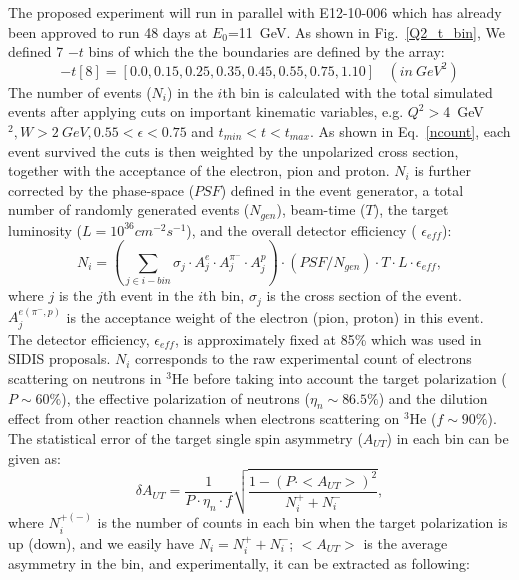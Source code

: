 The proposed experiment will run in parallel with E12-10-006 which has already been approved to run 48 days at $E_{0}$=11~GeV.  As shown in
Fig.~\ref{Q2_t_bin}, We defined 7 $-t$ bins of which the the boundaries are
defined by the array:
 \begin{equation}
     -t[8] = [0.0, 0.15, 0.25, 0.35, 0.45, 0.55, 0.75, 1.10]~~~~(in~GeV^{2})
 \end{equation}
The number of events ($N_{i}$) in the $i$th bin is calculated with the total
simulated events after applying cuts on important kinematic variables,
e.g. $Q^{2}>$4~GeV$^{2}, W>2~GeV, 0.55<\epsilon<0.75$ and $t_{min}<t<t_{max}$. As
shown in Eq.~\ref{ncount}, each event survived the cuts is then weighted by the
unpolarized cross section, together with the acceptance of the electron, pion and
proton. $N_{i}$ is further corrected by the phase-space ($PSF$) defined in the
event generator, a total number of randomly generated events ($N_{gen}$),
beam-time ($T$), the target luminosity ($L=10^{36} cm^{-2}s^{-1}$), and the
overall detector efficiency ( $\epsilon_{eff}$):
 \begin{equation}
     N_{i} = (\sum_{j\in i-bin} \sigma_{j}\cdot A^{e}_{j} \cdot
     A^{\pi^{-}}_{j} \cdot A^{p}_{j}) \cdot (PSF/N_{gen}) \cdot T \cdot L \cdot
     \epsilon_{eff},
     \label{ncount}
 \end{equation}
where $j$ is the $j$th event in the $i$th bin, $\sigma_{j}$ is the cross
section of the event. $A^{e(\pi^{-},p)}_{j}$ is the acceptance weight of the
electron (pion, proton) in this event. The detector efficiency,
$\epsilon_{eff}$, is approximately fixed at 85\% which was used in SIDIS proposals. $N_{i}$ corresponds to the raw
experimental count of electrons scattering on neutrons in $\mathrm{^{3}He}$
before taking into account the target polarization ($P\sim60\%$), the
effective polarization of neutrons ($\eta_{n}\sim86.5\%$) and the dilution
effect from other reaction channels when electrons scattering on
$\mathrm{^{3}He}$ ($f \sim 90\%$). The statistical error of the target single
spin asymmetry ($A_{UT}$) in each bin can be given as:
  \begin{equation}
    \delta A_{UT} = \frac{1}{P\cdot\eta_{n}\cdot f} \sqrt{\frac{1-(P\cdot
        <A_{UT}>)^{2}}{N^{+}_{i}+N^{-}_{i}}},
    \label{stat_err}
 \end{equation}
where $N^{+(-)}_{i}$ is the number of counts in each bin when the target
polarization is up (down), and we easily have $N_{i}=N^{+}_{i}+N^{-}_{i}$;
$<A_{UT}>$ is the average asymmetry in the bin, and experimentally, it can be extracted as following:
